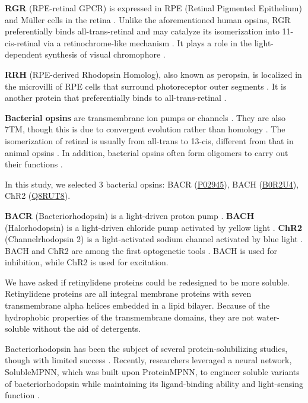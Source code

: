 \documentclass[fleqn,10pt,lineno]{manuscript}
\begin{document}
\textbf{RGR} (RPE-retinal GPCR) is expressed in RPE (Retinal Pigmented Epithelium) and M\"uller cells in the retina \citep{Shen_1994}. Unlike the aforementioned human opsins, RGR preferentially binds all-trans-retinal and may catalyze its isomerization into 11-cis-retinal via a retinochrome-like mechanism \citep{Radu_2008}. It plays a role in the light-dependent synthesis of visual chromophore \citep{Radu_2008}.

\textbf{RRH} (RPE-derived Rhodopsin Homolog), also known as peropsin, is localized in the microvilli of RPE cells that surround photoreceptor outer segments \citep{Sun_1997}. It is another protein that preferentially binds to all-trans-retinal \citep{Cook_2017}. 

\textbf{Bacterial opsins} are transmembrane ion pumps or channels \citep{Findlay_1986, Zhang_2011}. They are also 7TM, though this is due to convergent evolution rather than homology \citep{Yee_2013}. The isomerization of retinal is usually from all-trans to 13-cis, different from that in animal opsins \citep{Findlay_1986, Spudich_2000}. In addition, bacterial opsins often form oligomers to carry out their functions \citep{Taguchi_2023, Gmelin_2007, Shan_2024}.

In this study, we selected 3 bacterial opsins: BACR (\href{https://www.uniprot.org/uniprotkb/P02945/entry}{P02945}), BACH (\href{https://www.uniprot.org/uniprotkb/B0R2U4/entry}{B0R2U4}), ChR2 (\href{https://www.uniprot.org/uniprotkb/Q8RUT8/entry}{Q8RUT8}). 

\textbf{BACR} (Bacteriorhodopsin) is a light-driven proton pump \citep{Oesterhelt_1971}. \textbf{BACH} (Halorhodopsin) is a light-driven chloride pump activated by yellow light \citep{Schobert_1982}. \textbf{ChR2} (Channelrhodopsin 2) is a light-activated sodium channel activated by blue light \citep{Nagel_2003}. BACH and ChR2 are among the first optogenetic tools \citep{Zhang_2007, Han_2007}. BACH is used for inhibition, while ChR2 is used for excitation. 

We have asked if retinylidene proteins could be redesigned to be more soluble. Retinylidene proteins are all integral membrane proteins with seven transmembrane alpha helices embedded in a lipid bilayer. Because of the hydrophobic properties of the transmembrane domains, they are not water-soluble without the aid of detergents. 

Bacteriorhodopsin has been the subject of several protein-solubilizing studies, though with limited success \citep{Sirokman_1993, Gibas_1997, Mitra_2002}. Recently, researchers leveraged a neural network, SolubleMPNN, which was built upon ProteinMPNN, to engineer soluble variants of bacteriorhodopsin while maintaining its ligand-binding ability and light-sensing function \citep{Nikolaev_2024}.
\end{document}
